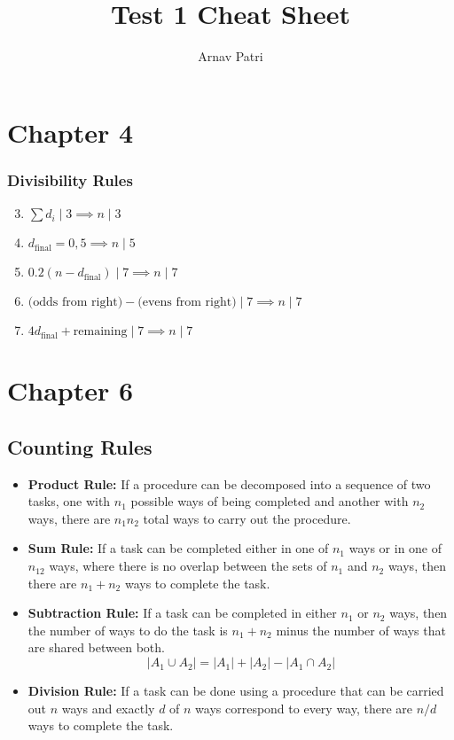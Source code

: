 \documentclass[12pt, A4, twocolumn]{article}
\title{Test 1 Cheat Sheet}
\author{Arnav Patri}
\begin{document}
	\section*{Chapter 4}
		\subsubsection*{Divisibility Rules}
			\begin{enumerate}
				\setcounter{enumi}{2}
				\item
					\(\displaystyle\sum d_i \mid 3 \implies n \mid 3\)
				\setcounter{enumi}{4}
				\item
					\(d_{\text{final}} = 0, 5 \implies n \mid 5\)
				\setcounter{enumi}{6}
				\item
					\(0.2(n - d_{\text{final}}) \mid 7 \implies n \mid 7\)
				\setcounter{enumi}{10}
				\item
					\(\text{(odds from right)} - \text{(evens from right)} \mid 7 \implies n \mid 7\)
				\setcounter{enumi}{12}
				\item
					\(4d_{\text{final}} + \text{remaining} \mid 7 \implies n \mid 7\)
			\end{enumerate}
	\section*{Chapter 6}
		\subsection*{Counting Rules}
			\begin{itemize}
				\item
					\textbf{Product Rule:} If a procedure can be decomposed into a sequence of two tasks, one with \(n_1\) possible ways of being completed and another with \(n_2\) ways, there are \(n_1n_2\) total ways to carry out the procedure.
				\item
					\textbf{Sum Rule:} If a task can be completed either in one of \(n_1\) ways or in one of \(n_12\) ways, where there is no overlap between the sets of \(n_1\) and \(n_2\) ways, then there are \(n_1 + n_2\) ways to complete the task.
				\item
					\textbf{Subtraction Rule:} If a task can be completed in either \(n_1\) or \(n_2\) ways, then the number of ways to do the task is \(n_1 + n_2\) minus the number of ways that are shared between both.
						\[|A_1 \cup A_2| = |A_1| + |A_2| - |A_1 \cap A_2|\]
				\item
					\textbf{Division Rule:} If a task can be done using a procedure that can be carried out \(n\) ways and exactly \(d\) of \(n\) ways correspond to every way, there are \(n/d\) ways to complete the task.
			\end{itemize}
\end{document}

